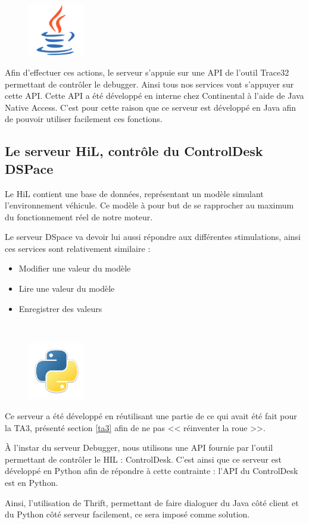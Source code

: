 \begin{figure}
	\vspace{-40px}
	\includegraphics[width=2.5cm]{contents/images/logoJava.png}
\end{figure}
Afin d'effectuer ces actions, le serveur s'appuie sur une API de l'outil Trace32 permettant de contrôler le debugger. Ainsi tous nos services vont s'appuyer sur cette API. Cette API a été développé en interne chez Continental à l'aide de Java Native Access. C'est pour cette raison que ce serveur est développé en Java afin de pouvoir utiliser
facilement ces fonctions.

\subsection{Le serveur HiL, contrôle du ControlDesk DSPace}
\vspace{-10px}
Le HiL contient une base de données, représentant un modèle simulant l'environnement véhicule. Ce modèle à pour but de se rapprocher au maximum du fonctionnement réel de notre moteur.

Le serveur DSpace va devoir lui aussi répondre aux différentes stimulations, ainsi ces services sont relativement similaire : 
\begin{itemize}
	\item Modifier une valeur du modèle
	\item Lire une valeur du modèle
	\item Enregistrer des valeurs
\end{itemize}~

\begin{figure}
	\includegraphics[width=2.5cm]{contents/images/python.png}
\end{figure}
Ce serveur a été développé en réutilisant une partie de ce qui avait été fait pour la TA3, présenté section \ref{ta3} afin de ne pas
<< réinventer la roue >>. 

À l'instar du serveur Debugger, nous utilisons une API fournie par l'outil permettant de contrôler le HIL : ControlDesk. 
C'est ainsi que ce serveur est développé en Python afin de répondre à cette contrainte : l'API du ControlDesk est en Python. 

Ainsi, l'utilisation de Thrift, permettant de faire dialoguer du Java côté client et du Python côté serveur facilement, ce sera imposé comme solution.


